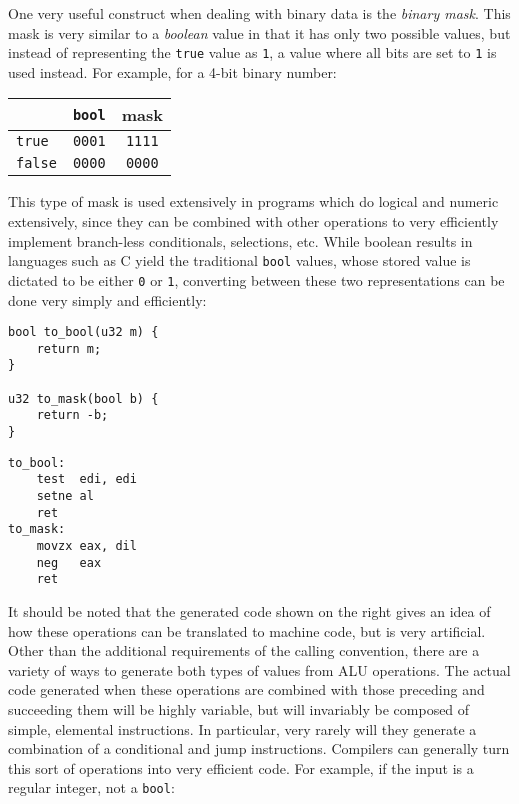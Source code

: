 One very useful construct when dealing with binary data is the \textit{binary
mask}.  This mask is very similar to a \textit{boolean} value in that it has
only two possible values, but instead of representing the \texttt{true} value as
\texttt{1}, a value where all bits are set to \texttt{1} is used instead.  For
example, for a 4-bit binary number:

\begin{center}
    \begin{tabular}{l|cc}
        & \texttt{bool} & mask \\
        \hline
        \texttt{true}  & \texttt{0001} & \texttt{1111} \\
        \texttt{false} & \texttt{0000} & \texttt{0000} \\
    \end{tabular}
\end{center}

This type of mask is used extensively in programs which do logical and numeric
extensively, since they can be combined with other operations to very
efficiently implement branch-less conditionals, selections, etc.  While boolean
results in languages such as C yield the traditional \texttt{bool} values, whose
stored value is dictated to be either \texttt{0} or \texttt{1}, converting
between these two representations can be done very simply and
efficiently\footnotemark:


\begin{multicols}{2}
    \begin{lstlisting}[style=c]
bool to_bool(u32 m) {
    return m;
}

u32 to_mask(bool b) {
    return -b;
}
    \end{lstlisting}
    \columnbreak
    \begin{lstlisting}[style=x86]
to_bool:
    test  edi, edi
    setne al
    ret
to_mask:
    movzx eax, dil
    neg   eax
    ret
    \end{lstlisting}
\end{multicols}
\vspace{-\baselineskip}

It should be noted that the generated code shown on the right gives an idea of
how these operations can be translated to machine code, but is very artificial.
Other than the additional requirements of the calling convention, there are a
variety of ways to generate both types of values from ALU operations.  The
actual code generated when these operations are combined with those preceding
and succeeding them will be highly variable, but will invariably be composed of
simple, elemental instructions.  In particular, very rarely will they generate a
combination of a conditional and jump instructions.  Compilers can generally
turn this sort of operations into very efficient code.  For example, if the
input is a regular integer, not a \texttt{bool}:

